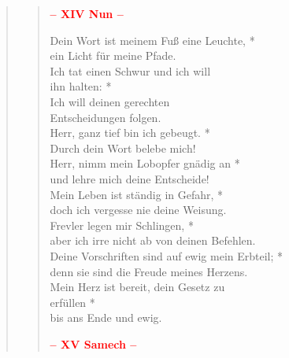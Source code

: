 \begin{quote}
 
\begin{verse}
 

\begin{center}
 \textcolor{red}{\normalsize\bf – XIV Nun –}\\
\end{center} 



 Dein Wort ist meinem Fuß eine Leuchte, *\\
ein Licht für meine Pfade.\\ \vin 
 Ich tat einen Schwur und ich will\\ \vin  ihn halten: *\\ \vin
Ich will deinen gerechten\\ \vin  Entscheidungen folgen.\\
 Herr, ganz tief bin ich gebeugt. *\\
Durch dein Wort belebe mich!\\ \vin
 Herr, nimm mein Lobopfer gnädig an *\\ \vin
und lehre mich deine Entscheide!\\ 
 Mein Leben ist ständig in Gefahr, *\\
doch ich vergesse nie deine Weisung.\\ \vin 
  Frevler legen mir Schlingen, *\\ \vin
aber ich irre nicht ab von deinen Befehlen.\\ 
   Deine Vorschriften sind auf ewig mein Erbteil; *\\
denn sie sind die Freude meines Herzens.\\ \vin
  Mein Herz ist bereit, dein Gesetz zu \\ \vin erfüllen *\\ \vin
bis ans Ende und ewig.\\ 

\begin{center}
 \textcolor{red}{\normalsize\bf – XV Samech –}\\
\end{center} 




\end{verse}
\end{quote}

